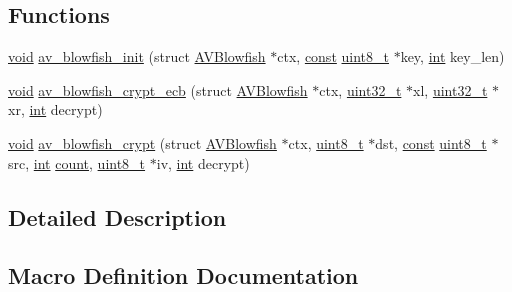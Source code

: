 \subsection*{Functions}
\begin{DoxyCompactItemize}
\item 
\hyperlink{sound_8c_ae35f5844602719cf66324f4de2a658b3}{void} \hyperlink{group__lavu__blowfish_gabdeab79ba02586b6c06240eeb3472837}{av\+\_\+blowfish\+\_\+init} (struct \hyperlink{struct_a_v_blowfish}{A\+V\+Blowfish} $\ast$ctx, \hyperlink{getopt1_8c_a2c212835823e3c54a8ab6d95c652660e}{const} \hyperlink{lib-src_2ffmpeg_2win32_2stdint_8h_a9a941819355e6f658991890ff66b4b0e}{uint8\+\_\+t} $\ast$key, \hyperlink{xmltok_8h_a5a0d4a5641ce434f1d23533f2b2e6653}{int} key\+\_\+len)
\item 
\hyperlink{sound_8c_ae35f5844602719cf66324f4de2a658b3}{void} \hyperlink{group__lavu__blowfish_ga7b57de27a9aa26b67ac1f0d67fea781b}{av\+\_\+blowfish\+\_\+crypt\+\_\+ecb} (struct \hyperlink{struct_a_v_blowfish}{A\+V\+Blowfish} $\ast$ctx, \hyperlink{lib-src_2ffmpeg_2win32_2stdint_8h_a6eb1e68cc391dd753bc8ce896dbb8315}{uint32\+\_\+t} $\ast$xl, \hyperlink{lib-src_2ffmpeg_2win32_2stdint_8h_a6eb1e68cc391dd753bc8ce896dbb8315}{uint32\+\_\+t} $\ast$xr, \hyperlink{xmltok_8h_a5a0d4a5641ce434f1d23533f2b2e6653}{int} decrypt)
\item 
\hyperlink{sound_8c_ae35f5844602719cf66324f4de2a658b3}{void} \hyperlink{group__lavu__blowfish_gaad9e1113615df7f3e883ad48e7ee764b}{av\+\_\+blowfish\+\_\+crypt} (struct \hyperlink{struct_a_v_blowfish}{A\+V\+Blowfish} $\ast$ctx, \hyperlink{lib-src_2ffmpeg_2win32_2stdint_8h_a9a941819355e6f658991890ff66b4b0e}{uint8\+\_\+t} $\ast$dst, \hyperlink{getopt1_8c_a2c212835823e3c54a8ab6d95c652660e}{const} \hyperlink{lib-src_2ffmpeg_2win32_2stdint_8h_a9a941819355e6f658991890ff66b4b0e}{uint8\+\_\+t} $\ast$src, \hyperlink{xmltok_8h_a5a0d4a5641ce434f1d23533f2b2e6653}{int} \hyperlink{metrics_8c_afea6e77db19a2f8c91419904fe665a3a}{count}, \hyperlink{lib-src_2ffmpeg_2win32_2stdint_8h_a9a941819355e6f658991890ff66b4b0e}{uint8\+\_\+t} $\ast$iv, \hyperlink{xmltok_8h_a5a0d4a5641ce434f1d23533f2b2e6653}{int} decrypt)
\end{DoxyCompactItemize}


\subsection{Detailed Description}


\subsection{Macro Definition Documentation}
